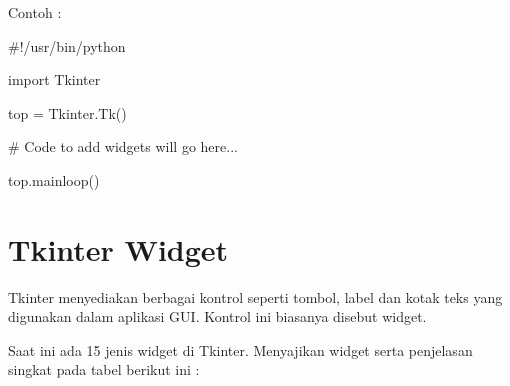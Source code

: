 \documentclass{wileySix}
\begin{document}
\begin{myEnumerate}
{%


\newpage

\vspace{12pt}
\vspace{12pt}
\noindent 
Contoh : \par
\noindent 
{\fontsize{10pt}{10pt}\selectfont  $  \#  $!/usr/bin/python} \par
\vspace{10pt}
\noindent 
{\fontsize{10pt}{10pt}\selectfont import Tkinter} \par
\noindent 
{\fontsize{10pt}{10pt}\selectfont top = Tkinter.Tk()} \par
\noindent 
{\fontsize{10pt}{10pt}\selectfont   $  \#  $ Code to add widgets will go here...} \par
\noindent 
{\fontsize{10pt}{10pt}\selectfont top.mainloop()} \par
\vspace{10pt}
\noindent 

\section{Tkinter Widget}
\par
\noindent 
\hspace*{0.5in} Tkinter menyediakan berbagai kontrol seperti tombol, label dan kotak teks yang digunakan dalam aplikasi GUI. Kontrol ini biasanya disebut widget.  \par
\noindent 
\hspace*{0.5in} Saat ini ada 15 jenis widget di Tkinter. Menyajikan widget serta penjelasan singkat pada tabel berikut ini : \par




}
\end{myEnumerate}
\end{document}

